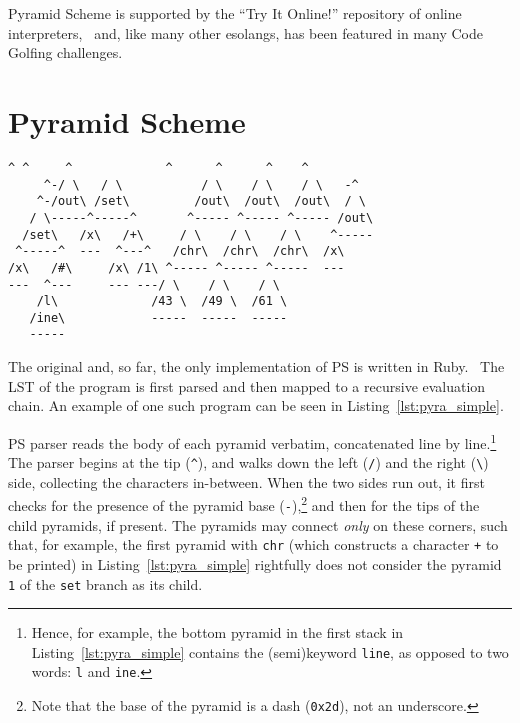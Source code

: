 \documentclass[aip,jcp,reprint,footinbib]{revtex4-1}
\let\tt\texttt
\newcommand{\ilpsll}[1]{\lstinline[language=psll,columns=flexible]{#1}}
\begin{document}
Pyramid Scheme is supported by the \enquote{Try It Online!} repository of online interpreters,~\cite{tio} and, like many other esolangs, has been featured in many Code Golfing challenges.~\cite{golf_se}

\section{Pyramid Scheme}

\begin{lstlisting}[float,language=pyra,
    label=lst:pyra_simple, caption={
        A simple Pyramid Scheme program. It takes one input from \tt{stdin} -- \ilpsll{(set x (\# stdin))}, increments it by one -- \ilpsll{(set x (+ x 1))} and prints the result computation to the command line. \href{https://tio.run/\%23\%23dZDRCoMwDEXf@xWFPY4SRBnsX0JhuILC3IY6cF/fpUlbV91SzDEl9zbk@R4vQ381U9u5wXmvOSwd4XfYPaySfwMaiZJTxKqAEQUJHq8ZNUxuXiVyt4VGJXITwkpOI3G1AQtJk8xh4XzEv1NFpdLZPfhwFV6CthtxhwVVdD5EZ6qgwt9DBUeVXbk/kL7dQLwhuGGxfGjq0ADNmXGq4lr6uysa19cyVLr2vv4A}{Try it online!}
}]
      ^ ^     ^             ^      ^      ^    ^
     ^-/ \   / \           / \    / \    / \   -^
    ^-/out\ /set\         /out\  /out\  /out\  / \
   / \-----^-----^       ^----- ^----- ^----- /out\
  /set\   /x\   /+\     / \    / \    / \    ^-----
 ^-----^  ---  ^---^   /chr\  /chr\  /chr\  /x\
/x\   /#\     /x\ /1\ ^----- ^----- ^-----  ---
---  ^---     --- ---/ \    / \    / \
    /l\             /43 \  /49 \  /61 \
   /ine\            -----  -----  -----
   -----
\end{lstlisting}

The original and, so far, the only implementation of PS is written in Ruby.~\cite{pyra_git} The LST of the program is first parsed and then mapped to a recursive evaluation chain. An example of one such program can be seen in Listing~\ref{lst:pyra_simple}.

PS parser reads the body of each pyramid verbatim, concatenated line by line.\footnote{Hence, for example, the bottom pyramid in the first stack in Listing~\ref{lst:pyra_simple} contains the (semi)keyword \tt{line}, as opposed to two words: \tt{l} and \tt{ine}.} The parser begins at the tip (\tt{\^}), and walks down the left (\tt{/}) and the right (\tt{\textbackslash}) side, collecting the characters in-between. When the two sides run out, it first checks for the presence of the pyramid base (\tt{-}),\footnote{Note that the base of the pyramid is a dash (\tt{0x2d}), not an underscore.} and then for the tips of the child pyramids, if present. The pyramids may connect \emph{only} on these corners, such that, for example, the first pyramid with \tt{chr} (which constructs a character \tt{+} to be printed) in Listing~\ref{lst:pyra_simple} rightfully does not consider the pyramid \tt{1} of the \tt{set} branch as its child.
\end{document}
